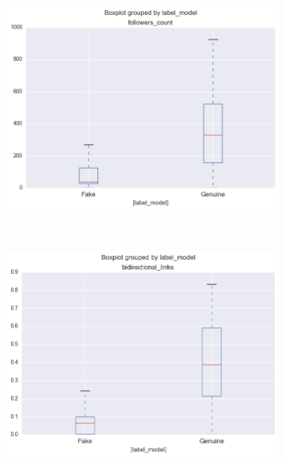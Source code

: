 \documentclass[a4paper, 12pt]{report}
\begin{document}
\begin{figure}[H]
	\centering
	\begin{subfigure}[c]{0.3\linewidth}
		\includegraphics[width =\linewidth]{followers_count.png}
	\end{subfigure}
	~
    \begin{subfigure}[c]{0.3\linewidth}
    	\includegraphics[width =\linewidth]{bidirectional_links.png}
    \end{subfigure}
	~
    \begin{subfigure}[c]{0.3\linewidth}

\end{subfigure}
\end{figure}
\end{document}
